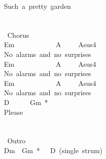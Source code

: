 {Such\ a\ pretty\ garden\\
\\
\\
\lbrack\ Chorus\rbrack\\
Em\ \ \ \ \ \ \ \ \ \ \ \ A\ \ \ \ \ Asus4\\
No\ alarms\ and\ no\ surprises\\
Em\ \ \ \ \ \ \ \ \ \ \ \ A\ \ \ \ \ Asus4\\
No\ alarms\ and\ no\ surprises\\
Em\ \ \ \ \ \ \ \ \ \ \ \ A\ \ \ \ \ Asus4\\
No\ alarms\ and\ no\ surprises\\
D\ \ \ \ \ \ Gm\ *\\
Please\\
\\
\\
\lbrack\ Outro\rbrack\\
Dm\ \ Gm\ *\ \ \ D\ (single\ strum)}

